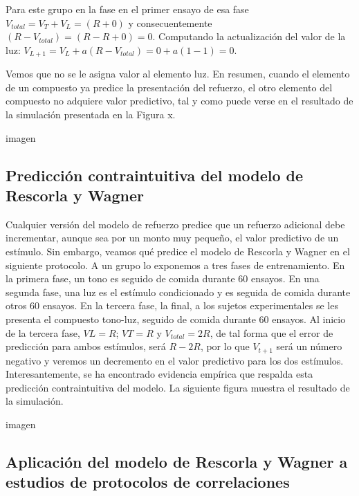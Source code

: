\documentclass[
  letterpaper,
]{book}
\begin{document}
Para este grupo en la fase en el primer ensayo de esa fase
\(V_{total} = V_T + V_L = (R + 0)\) y consecuentemente
\((R - V_{total}) =  (R - R +0) = 0\). Computando la actualización del
valor de la luz:
\(V_{L+1} = V_L + a (R - V_{total}) = 0 + a (1 - 1) = 0\).

Vemos que no se le asigna valor al elemento luz. En resumen, cuando el
elemento de un compuesto ya predice la presentación del refuerzo, el
otro elemento del compuesto no adquiere valor predictivo, tal y como
puede verse en el resultado de la simulación presentada en la Figura x.

imagen

\subsection{Predicción contraintuitiva del modelo de Rescorla y
Wagner}\label{predicciuxf3n-contraintuitiva-del-modelo-de-rescorla-y-wagner}

Cualquier versión del modelo de refuerzo predice que un refuerzo
adicional debe incrementar, aunque sea por un monto muy pequeño, el
valor predictivo de un estímulo. Sin embargo, veamos qué predice el
modelo de Rescorla y Wagner en el siguiente protocolo. A un grupo lo
exponemos a tres fases de entrenamiento. En la primera fase, un tono es
seguido de comida durante 60 ensayos. En una segunda fase, una luz es el
estímulo condicionado y es seguida de comida durante otros 60 ensayos.
En la tercera fase, la final, a los sujetos experimentales se les
presenta el compuesto tono-luz, seguido de comida durante 60 ensayos. Al
inicio de la tercera fase, \(VL = R\); \(VT = R\) y \(V_{total} = 2R\),
de tal forma que el error de predicción para ambos estímulos, será
\(R - 2R\), por lo que \(V_{t+1}\) será un número negativo y veremos un
decremento en el valor predictivo para los dos estímulos.
Interesantemente, se ha encontrado evidencia empírica que respalda esta
predicción contraintuitiva del modelo. La siguiente figura muestra el
resultado de la simulación.

imagen

\subsection{Aplicación del modelo de Rescorla y Wagner a estudios de
protocolos de
correlaciones}\label{aplicaciuxf3n-del-modelo-de-rescorla-y-wagner-a-estudios-de-protocolos-de-correlaciones}
\end{document}
